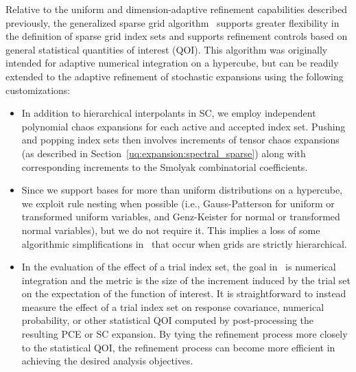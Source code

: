
Relative to the uniform and dimension-adaptive refinement capabilities
described previously, the generalized sparse grid
algorithm~\cite{Gerstner_Griebel_2003} supports greater flexibility in
the definition of sparse grid index sets and supports refinement
controls based on general statistical quantities of interest (QOI).
This algorithm was originally intended for adaptive numerical
integration on a hypercube, but can be readily extended to the
adaptive refinement of stochastic expansions using the following
customizations:
\begin{itemize}
\item In addition to hierarchical interpolants in SC, we employ
  independent polynomial chaos expansions for each active and accepted
  index set.  Pushing and popping index sets then involves increments
  of tensor chaos expansions (as described in
  Section~\ref{uq:expansion:spectral_sparse}) along with corresponding
  increments to the Smolyak combinatorial coefficients.
\item Since we support bases for more than uniform distributions on a
  hypercube, we exploit rule nesting when possible (i.e.,
  Gauss-Patterson for uniform or transformed uniform variables, and
  Genz-Keister for normal or transformed normal variables), but we do
  not require it.  This implies a loss of some algorithmic
  simplifications in~\cite{Gerstner_Griebel_2003} that occur when
  grids are strictly hierarchical.
\item In the evaluation of the effect of a trial index set, the goal
  in~\cite{Gerstner_Griebel_2003} is numerical integration and the
  metric is the size of the increment induced by the trial set on the
  expectation of the function of interest.  It is straightforward to
  instead measure the effect of a trial index set on response
  covariance, numerical probability, or other statistical QOI
  computed by post-processing the resulting PCE or SC expansion.  
  By tying the refinement process more closely to the statistical QOI,
  the refinement process can become more efficient in achieving the
  desired analysis objectives.
\end{itemize}


